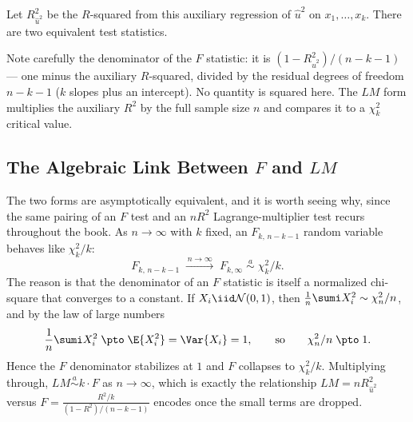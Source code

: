 Let $R^2_{\hat u^2}$ be the $R$-squared from this auxiliary regression of $\hat u^2$ on $x_1,\dots,x_k$. There are two equivalent test statistics.


Note carefully the denominator of the $F$ statistic: it is $(1 - R^2_{\hat u^2})/(n-k-1)$ --- one minus the auxiliary $R$-squared, divided by the residual degrees of freedom $n-k-1$ ($k$ slopes plus an intercept). No quantity is squared here. The $LM$ form multiplies the auxiliary $R^2$ by the full sample size $n$ and compares it to a $\chi^2_k$ critical value.


\subsection{The Algebraic Link Between $F$ and $LM$}

The two forms are asymptotically equivalent, and it is worth seeing why, since the same pairing of an $F$ test and an $n R^2$ Lagrange-multiplier test recurs throughout the book. As $n \to \infty$ with $k$ fixed, an $F_{k,\,n-k-1}$ random variable behaves like $\chi^2_k / k$:
\[
F_{k,\,n-k-1} \;\xrightarrow{\,n\to\infty\,}\; F_{k,\infty} \;\overset{a}{\sim}\; \chi^2_k / k .
\]
The reason is that the denominator of an $F$ statistic is itself a normalized chi-square that converges to a constant. If $X_i \iid \mathcal N(0,1)$, then $\frac1n\sumi X_i^2 \sim \chi^2_n/n$, and by the law of large numbers
\[
\frac1n\sumi X_i^2 \;\pto\; \E{X_i^2} = \Var{X_i} = 1,
\qquad\text{so}\qquad \chi^2_n / n \;\pto\; 1 .
\]
Hence the $F$ denominator stabilizes at $1$ and $F$ collapses to $\chi^2_k/k$. Multiplying through, $LM \overset{a}{\sim} k \cdot F$ as $n \to \infty$, which is exactly the relationship $LM = nR^2_{\hat u^2}$ versus $F = \tfrac{R^2/k}{(1-R^2)/(n-k-1)}$ encodes once the small terms are dropped.

